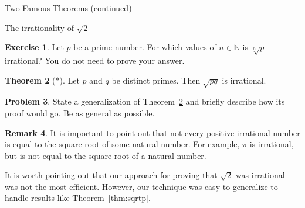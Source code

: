 \documentclass[11pt]{article}
\theoremstyle{definition}
\newtheorem{theorem}{Theorem}[section]
\newtheorem{exercise}[theorem]{Exercise}
\newtheorem{problem}[theorem]{Problem}
\newtheorem{remark}[theorem]{Remark}
\begin{document}
\begin{section}{Two Famous Theorems (continued)}
\begin{subsection}{The irrationality of $\sqrt{2}$}
\begin{exercise}
Let $p$ be a prime number.  For which values of $n\in\mathbb{N}$ is $\sqrt[n]{p}$ irrational?  You do not need to prove your answer.
\end{exercise}

\begin{theorem}[*]\label{thm:sqrt(pq)}
Let $p$ and $q$ be distinct primes.  Then $\sqrt{pq}$ is irrational.
\end{theorem}

\begin{problem}
State a generalization of Theorem~\ref{thm:sqrt(pq)} and briefly describe how its proof would go.  Be as general as possible.
\end{problem}

\begin{remark}
It is important to point out that not every positive irrational number is equal to the square root of some natural number.  For example, $\pi$ is irrational, but is not equal to the square root of a natural number.
\end{remark}

It is worth pointing out that our approach for proving that $\sqrt{2}$ was irrational was not the most efficient.  However, our technique was easy to generalize to handle results like Theorem~\ref{thm:sqrtp}.

\end{subsection}

\end{section}
\end{document}
